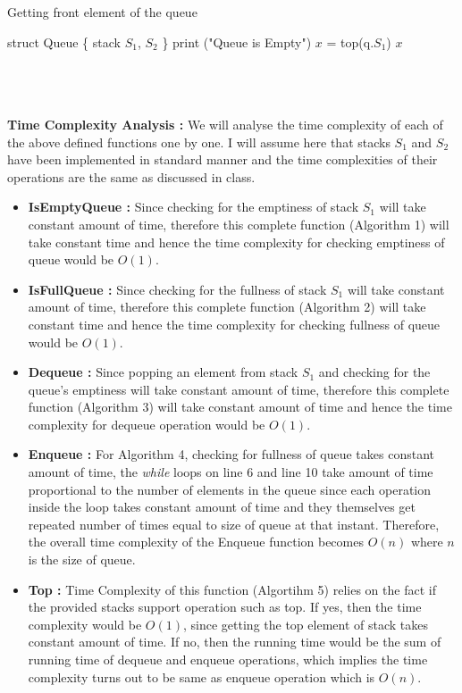 \documentclass{article}
\begin{document}
{{        \colorbox[gray]{0.95}{
        \begin{algorithm2e}[H] 
        \caption{Getting front element of the queue}
            \DontPrintSemicolon
            struct Queue \{ stack $S_1$, $S_2$ \}\;
             {
                 {
                    print ("Queue is Empty") \;
                    \KwRet
                }
                $x$ = top(q.$S_1$) \;
                \KwRet $x$
            }
        \end{algorithm2e}
        } 
        \\ \\ \\
        \textbf{Time Complexity Analysis :} We will analyse the time complexity of each of the above defined functions one by one. I will assume here that stacks $S_1$ and $S_2$ have been implemented in standard manner and the time complexities of their operations are the same as discussed in class.
        \begin{itemize}
        \item \textbf{IsEmptyQueue :} Since checking for the emptiness of stack $S_1$ will take constant amount of time, therefore this complete function (Algorithm 1) will take constant time and hence the time complexity for checking emptiness of queue would be $O(1)$.
        \item \textbf{IsFullQueue :} Since checking for the fullness of stack $S_1$ will take constant amount of time, therefore this complete function (Algorithm 2) will take constant time and hence the time complexity for checking fullness of queue would be $O(1)$.
        \item \textbf{Dequeue :} Since popping an element from stack $S_1$ and checking for the queue's emptiness will take constant amount of time, therefore this complete function (Algorithm 3) will take constant amount of time and hence the time complexity for dequeue operation would be $O(1)$.
        \item \textbf{Enqueue :} For Algorithm 4, checking for fullness of queue takes constant amount of time, the \emph{while} loops on line 6 and line 10 take amount of time proportional to the number of elements in the queue since each operation inside the loop takes constant amount of time and they themselves get repeated number of times equal to size of queue at that instant. Therefore, the overall time complexity of the Enqueue function becomes $O(n)$ where $n$ is the size of queue.
        \item \textbf{Top :} Time Complexity of this function (Algortihm 5) relies on the fact if the provided stacks support operation such as top. If yes, then the time complexity would be $O(1)$, since getting the top element of stack takes constant amount of time. If no, then the running time would be the sum of running time of dequeue and enqueue operations, which implies the time complexity turns out to be same as enqueue operation which is $O(n)$.
        \end {itemize}
    }
}
\end{document}
